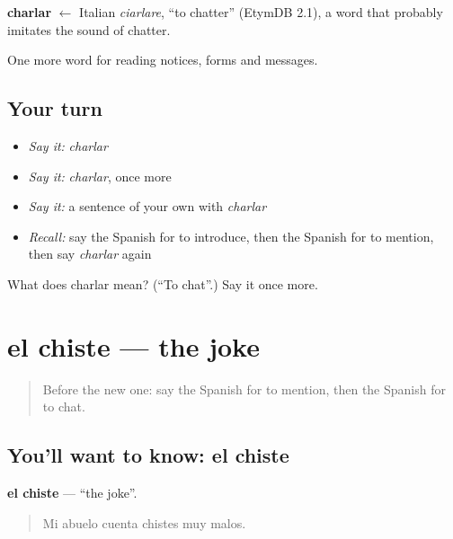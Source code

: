 \begin{cousinweb}
\textbf{charlar} $\leftarrow$ Italian \emph{ciarlare}, \textquotedblleft{}to chatter\textquotedblright{} (EtymDB 2.1), a word that probably imitates the sound of chatter.
\end{cousinweb}

\begin{grammarlens}[title={What you've built}]
One more word for reading notices, forms and messages.
\end{grammarlens}

\subsection*{Your turn}
\begin{itemize}
\raggedright
  \item \emph{Say it:} \emph{charlar}
  \item \emph{Say it:} \emph{charlar}, once more
  \item \emph{Say it:} a sentence of your own with \emph{charlar}
  \item \emph{Recall:} say the Spanish for to introduce, then the Spanish for to mention, then say \emph{charlar} again
\end{itemize}

\begin{tcolorbox}[breakable,colback=teal!4,colframe=teal!35!black,title={Before you move on}]
What does charlar mean? (\textquotedblleft{}To chat\textquotedblright{}.) Say it once more.
\end{tcolorbox}
\section[el chiste]{el chiste — the joke}

\label{lesson:ES-C502-chiste}



\begin{quote}
Before the new one: say the Spanish for to mention, then the Spanish for to chat.
\end{quote}

\subsection*{You'll want to know: el chiste}
\textbf{el chiste} — \textquotedblleft{}the joke\textquotedblright{}.

\begin{quote}
Mi abuelo cuenta chistes muy malos.
\end{quote}

